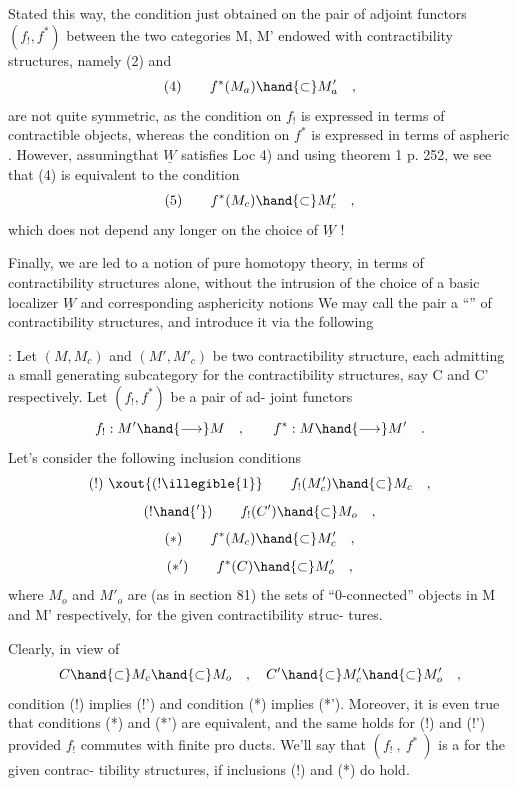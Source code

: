 
Stated this way, the condition just obtained on the pair of adjoint
functors $(f_!,f^*)$\hand{,} between the two  categories
M, M' endowed with contractibility structures, namely (2) and
\[ (4) \qquad f^*(M_a) \hand{\subset} M'_a \quad , \]
are not quite symmetric, as the condition on $f_!$ is expressed in terms
of contractible objects, whereas the condition on $f^*$ is expressed in
terms of aspheric  . %
However, assuming\hand{/}that $\underline{W}$ satisfies Loc 4)
and using theorem 1 p. 252, we see that (4) is equivalent to the
condition
\[ (5) \qquad f^*(M_c) \hand{\subset} M'_c \quad , \]
which does not depend any longer on the choice of $\underline{W}$ !

Finally, we are led to a notion of pure homotopy theory, in
terms of contractibility structures alone, without the intrusion of
the choice of a basic localizer $\underline{W}$ and corresponding asphericity notions
We may call  the pair a ``\hand{\uline{\textcolor{black}{bimorphism}}}'' of contractibility structures,
and introduce it via the following 

 \deleted{\hand{\uline{\textcolor{black}{Proposition}}}} : Let $(M,M_c)$ and $(M',M'_c)$ be two contractibility structure,
each admitting a small generating subcategory for the contractibility
structures, say C and C' respectively. Let $(f_!,f^*)$ be a pair of ad-%
joint functors
\[ f_! : M' \hand{\longrightarrow} M \quad , \qquad f^* : M \hand{\longrightarrow} M' \quad . \]
Let's consider the following inclusion conditions
\[ (!) \ \xout{(!\illegible{1}} \qquad f_!(M'_c) \hand{\subset} M_c \quad , \]
\[ (!\hand{'}) \qquad f_!(C') \hand{\subset} M_o \quad , \]
\[ (*) \qquad f^*(M_c) \hand{\subset} M'_c \quad , \]
\[ (*') \qquad f^*(C) \hand{\subset} M'_o \quad , \]
where $M_o$ and $M'_o$ are (as in section 81) the sets of ``0-connected''
objects in M and M' respectively, for the given contractibility struc-%
tures.
\par{} \deleted{(}Clearly, in view of
\[ C \hand{\subset} M_c \hand{\subset} M_o \quad , \quad C' \hand{\subset} M'_c \hand{\subset} M'_o \quad , \]
condition (!) implies (!') and condition (*) implies (*')\deleted{)}. Moreover,
it is even true that conditions (*) and (*') are equivalent, and the
same holds for (!) and (!') provided $f_!$ commutes with finite pro\hand{-}%
ducts. We'll say that $(f_!\ ,\ f^*\ )$ is a \hand{\uline{\textcolor{black}{bimorphism}}} for the given contrac-%
tibility structures, if  inclusions (!) and (*) do hold.

